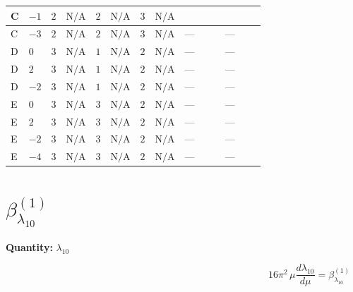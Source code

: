 \documentclass[8pt]{article}
\begin{document}
\begin{landscape}
\begin{longtable}{@{}llcccccc >{\raggedright\arraybackslash}p{0.21\linewidth} >{\raggedright\arraybackslash}p{0.21\linewidth}@{}}
\midrule
C & $-1$ & $2$ & $\text{N/A}$ & $2$ & $\text{N/A}$ & $3$ & $\text{N/A}$ & \scriptsize\adjustbox{max width=\linewidth}{$\begin{gathered} +2 {\lambda_{10}} {\lambda_{11}}\end{gathered}$} & \scriptsize\adjustbox{max width=\linewidth}{$\begin{gathered} +{\lambda_{X_{17}}^{(1)}}^2\end{gathered}$} \\
\midrule
C & $-3$ & $2$ & $\text{N/A}$ & $2$ & $\text{N/A}$ & $3$ & $\text{N/A}$ & --- & --- \\
\midrule
D & $0$ & $3$ & $\text{N/A}$ & $1$ & $\text{N/A}$ & $2$ & $\text{N/A}$ & --- & --- \\
\midrule
D & $2$ & $3$ & $\text{N/A}$ & $1$ & $\text{N/A}$ & $2$ & $\text{N/A}$ & --- & --- \\
\midrule
D & $-2$ & $3$ & $\text{N/A}$ & $1$ & $\text{N/A}$ & $2$ & $\text{N/A}$ & --- & --- \\
\midrule
E & $0$ & $3$ & $\text{N/A}$ & $3$ & $\text{N/A}$ & $2$ & $\text{N/A}$ & --- & --- \\
\midrule
E & $2$ & $3$ & $\text{N/A}$ & $3$ & $\text{N/A}$ & $2$ & $\text{N/A}$ & --- & --- \\
\midrule
E & $-2$ & $3$ & $\text{N/A}$ & $3$ & $\text{N/A}$ & $2$ & $\text{N/A}$ & --- & --- \\
\midrule
E & $-4$ & $3$ & $\text{N/A}$ & $3$ & $\text{N/A}$ & $2$ & $\text{N/A}$ & --- & --- \\
\midrule
\bottomrule
\end{longtable}
\clearpage
\section*{$\beta_{\lambda_{10}}^{(1)}$}
\noindent\textbf{Quantity: }$\lambda_{10}$\par\smallskip
\[16\pi^2\,\mu\frac{d \lambda_{10}}{d\mu}=\beta_{\lambda_{10}}^{(1)}\]

\end{landscape}
\end{document}

